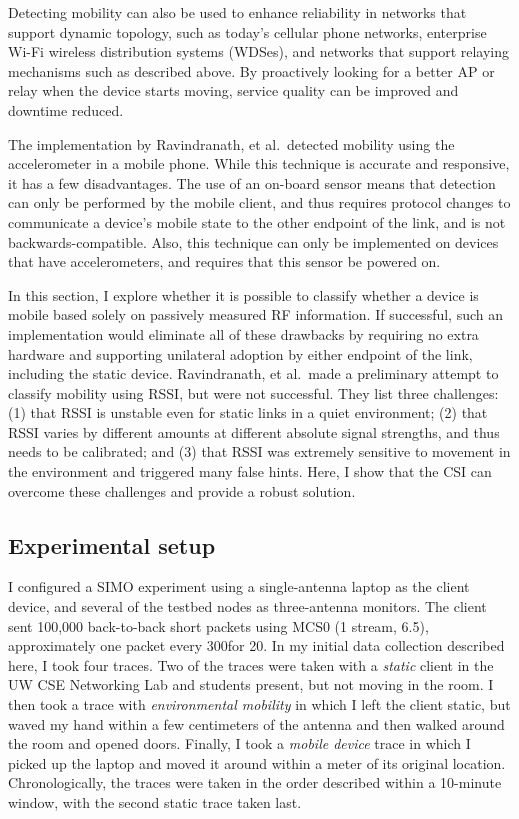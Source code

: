 Detecting mobility can also be used to enhance reliability in networks that support dynamic topology, such as today's cellular phone networks, enterprise Wi-Fi wireless distribution systems (WDSes), and networks that support relaying mechanisms such as described above. By proactively looking for a better AP or relay when the device starts moving, service quality can be improved and downtime reduced. 

The implementation by Ravindranath, et al.\ detected mobility using the accelerometer in a mobile phone. While this technique is accurate and responsive, it has a few disadvantages. The use of an on-board sensor means that detection can only be performed by the mobile client, and thus requires protocol changes to communicate a device's mobile state to the other endpoint of the link, and is not backwards-compatible. Also, this technique can only be implemented on devices that have accelerometers, and requires that this sensor be powered on.

In this section, I explore whether it is possible to classify whether a device is mobile based solely on passively measured RF information. If successful, such an implementation would eliminate all of these drawbacks by requiring no extra hardware and supporting unilateral adoption by either endpoint of the link, including the static device. Ravindranath, et al.\ made a preliminary attempt to classify mobility using RSSI, but were not successful. They list three challenges: (1) that RSSI is unstable even for static links in a quiet environment; (2) that RSSI varies by different amounts at different absolute signal strengths, and thus needs to be calibrated; and (3) that RSSI was extremely sensitive to movement in the environment and triggered many false hints. Here, I show that the CSI can overcome these challenges and provide a robust solution.

\subsection{Experimental setup}
I configured a SIMO experiment using a single-antenna laptop as the client device, and several of the testbed nodes as three-antenna monitors. The client sent 100,000 back-to-back short packets using MCS0 (1 stream, 6.5\Mbps), approximately one packet every 300\us for 20\s. In my initial data collection described here, I took four traces. Two of the traces were taken with a \emph{static} client in the UW CSE Networking Lab and students present, but not moving in the room. I then took a trace with \emph{environmental mobility} in which I left the client static, but waved my hand within a few centimeters of the antenna and then walked around the room and opened doors. Finally, I took a \emph{mobile device} trace in which I picked up the laptop and moved it around within a meter of its original location. Chronologically, the traces were taken in the order described within a 10-minute window, with the second static trace taken last. 

